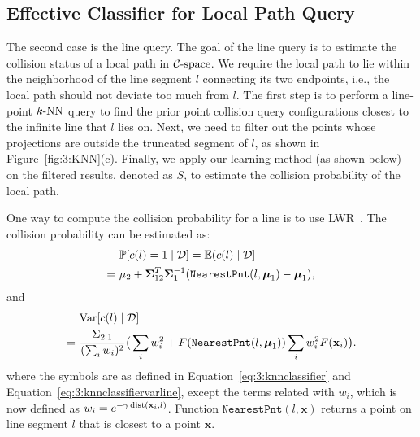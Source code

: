 \subsection{Effective Classifier for Local Path Query}
\label{subsec:3:knnreasoning:pathclassifier}
The second case is the line query. The goal of the line query is to estimate the collision status of a local path in $\mathcal C\text{-space}$. We require the local path to lie within the neighborhood of the line segment $l$ connecting its two endpoints, i.e., the local path should not deviate too much from $l$. The first step is to perform a line-point $k\text{-NN}$ query to find the prior point collision query configurations closest to the infinite line that $l$ lies on. Next, we need to filter out the points whose projections are outside the truncated segment of $l$, as shown in Figure~\ref{fig:3:KNN}(c). Finally, we apply our learning method (as shown below) on the filtered results, denoted as $S$, to estimate the collision probability of the local path.

One way to compute the collision probability for a line is to use LWR~\cite{Burns:2005:ICRA}. The collision probability can be estimated as:
\begin{align}
  \label{eq:3:knnclassifierline}
& \ \mathbb P[c(l) = 1 \mid \mathcal D] = \mathbb E(c(l) \mid \mathcal D] \\ \notag
=& \ \mu_2 + \boldsymbol \Sigma_{12}^T  \boldsymbol\Sigma_1^{-1} (\texttt{NearestPnt}(l, \boldsymbol \mu_1) - \boldsymbol \mu_1),
\end{align}
and
\begin{align}
\label{eq:3:knnclassifiervarline}
& \ \textrm{Var}[c(l) \mid \mathcal D] \\ \notag
=& \ \frac{\Sigma_{2|1}}{(\sum_i w_i)^2} \big( \sum_i w_i^2 + F(\texttt{NearestPnt}(l, \boldsymbol \mu_1)) \sum_i w_i^2 F(\mathbf x_i) \big).
\end{align}
where the symbols are as defined in Equation~\ref{eq:3:knnclassifier} and Equation~\ref{eq:3:knnclassifiervarline}, except the terms related with $w_i$, which is now defined as $w_i = e^{-\gamma \operatorname{dist}(\mathbf x_i, l)}$. Function $\texttt{NearestPnt}(l, \mathbf x)$ returns a point on line segment $l$ that is closest to a point $\mathbf x$.

